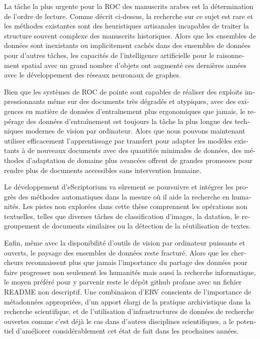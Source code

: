 \begin{french}
La tâche la plus urgente pour la ROC des manuscrits arabes est la détermination
de l'ordre de lecture. Comme décrit ci-dessus, la recherche sur ce sujet est
rare et les méthodes existantes sont des heuristiques artisanales incapables de
traiter la structure souvent complexe des manuscrits historiques. Alors que les
ensembles de données sont inexistants ou implicitement cachés dans des
ensembles de données pour d'autres tâches, les capacités de l'intelligence
artificielle pour le raisonnement spatial avec un grand nombre d'objets ont
augmenté ces dernières années avec le développement des réseaux neuronaux de
graphes.

Bien que les systèmes de ROC de pointe sont capables de réaliser des exploits
impressionnants même sur des documents très dégradés et atypiques, avec des
exigences en matière de données d'entraînement plus ergonomiques que jamais, le
repérage des données d'entraînement est toujours la tâche la plus longue des
techniques modernes de vision par ordinateur. Alors que nous pouvons maintenant
utiliser efficacement l'apprentissage par transfert pour adapter les modèles
existants à de nouveaux documents avec des quantités minimales de données, des
méthodes d'adaptation de domaine plus avancées offrent de grandes promesses
pour rendre plus de documents accessibles sans intervention humaine.

Le développement d'eScriptorium va sûrement se poursuivre et intégrer les
progrès des méthodes automatiques dans la mesure où il aide la recherche en
humanités. Les pistes non explorées dans cette thèse comprennent les
opérations non textuelles, telles que diverses tâches de classification
d'images, la datation, le regroupement de documents similaires ou la détection
de la réutilisation de textes.

Enfin, même avec la disponibilité d'outils de vision par ordinateur puissants
et ouverts, le paysage des ensembles de données reste fracturé. Alors que les
chercheurs reconnaissent plus que jamais l'importance du partage des données
pour faire progresser non seulement les humanités mais aussi la
recherche informatique, le moyen préféré pour y parvenir reste le dépôt github
profane avec un fichier README non descriptif. Une combinaison d'ERV conscients
de l'importance de métadonnées appropriées, d'un apport élargi de la pratique
archivistique dans la recherche scientifique, et de l'utilisation
d'infrastructures de données de recherche ouvertes comme c'est déjà le cas dans
d'autres disciplines scientifiques, a le potentiel d'améliorer considérablement
cet état de fait dans les prochaines années.

\end{french}

